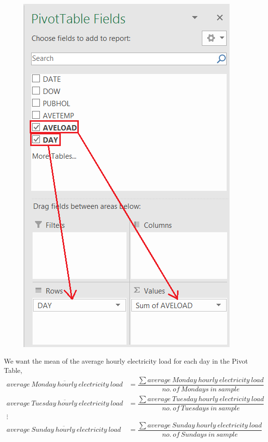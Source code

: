 \documentclass[12pt]{report}
\begin{document}
\begin{figure}[H]
	\centerline{\includegraphics{q1_7}}
\end{figure}
\vspace{-\baselineskip}
\noindent We want the mean of the average hourly electricity load for each day in the Pivot Table,
\begin{align*}
	\overline{average\ Monday\ hourly\ electricity\ load} &= \dfrac{\sum average\ Monday\ hourly\ electricity\ load}{no.\ of\ Mondays\ in\ sample} \\
	\overline{average\ Tuesday\ hourly\ electricity\ load} &= \dfrac{\sum average\ Tuesday\ hourly\ electricity\ load}{no.\ of\ Tuesdays\ in\ sample} \\
	\vdots \\
	\overline{average\ Sunday\ hourly\ electricity\ load} &= \dfrac{\sum average\ Sunday\ hourly\ electricity\ load}{no.\ of\ Sundays\ in\ sample}
\end{align*}
\end{document}
